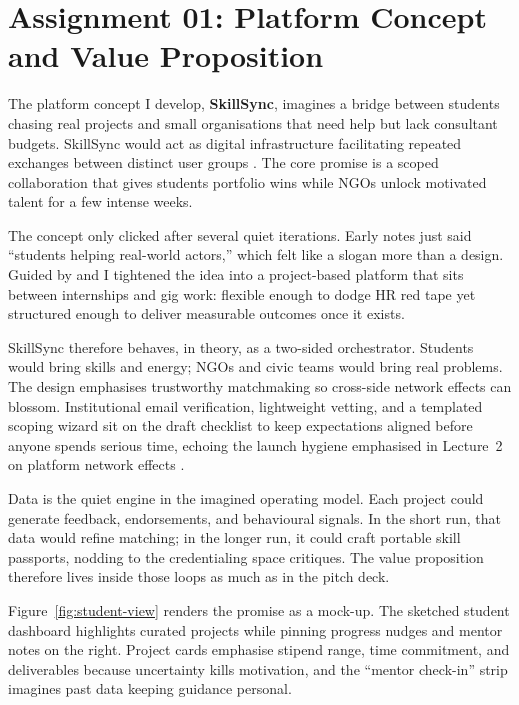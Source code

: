 \section*{Assignment 01: Platform Concept and Value Proposition}

The platform concept I develop, \textbf{SkillSync}, imagines a bridge between students chasing real projects and small organisations that need help but lack consultant budgets. SkillSync would act as digital infrastructure facilitating repeated exchanges between distinct user groups \citep{Choudary2016}. The core promise is a scoped collaboration that gives students portfolio wins while NGOs unlock motivated talent for a few intense weeks.

The concept only clicked after several quiet iterations. Early notes just said ``students helping real-world actors,'' which felt like a slogan more than a design. Guided by \citet{Choudary2016} and \citet{Srnicek2017} I tightened the idea into a project-based platform that sits between internships and gig work: flexible enough to dodge HR red tape yet structured enough to deliver measurable outcomes once it exists.

SkillSync therefore behaves, in theory, as a two-sided orchestrator. Students would bring skills and energy; NGOs and civic teams would bring real problems. The design emphasises trustworthy matchmaking so cross-side network effects can blossom. Institutional email verification, lightweight vetting, and a templated scoping wizard sit on the draft checklist to keep expectations aligned before anyone spends serious time, echoing the launch hygiene emphasised in Lecture~2 on platform network effects \citep{Lecture02}.

Data is the quiet engine in the imagined operating model. Each project could generate feedback, endorsements, and behavioural signals. In the short run, that data would refine matching; in the longer run, it could craft portable skill passports, nodding to the credentialing space \citet{Zuboff2019} critiques. The value proposition therefore lives inside those loops as much as in the pitch deck.

Figure~\ref{fig:student-view} renders the promise as a mock-up. The sketched student dashboard highlights curated projects while pinning progress nudges and mentor notes on the right. Project cards emphasise stipend range, time commitment, and deliverables because uncertainty kills motivation, and the ``mentor check-in'' strip imagines past data keeping guidance personal.

